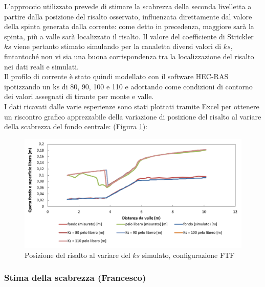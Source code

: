 \documentclass[12pt]{article} %
\begin{document}
\noindent L'approccio utilizzato prevede di stimare la scabrezza della seconda livelletta a partire dalla posizione del risalto osservato, influenzata direttamente dal valore della spinta generata dalla corrente: come detto in precedenza, maggiore sarà la spinta, più a valle sarà localizzato il risalto. Il valore del coefficiente di Strickler $ks$ viene pertanto stimato simulando per la canaletta diversi valori di $ks$, fintantoché non vi sia una buona corrispondenza tra la localizzazione del risalto nei dati reali e simulati.\\
Il profilo di corrente è stato quindi modellato con il software HEC-RAS ipotizzando un ks di 80, 90, 100 e 110 e adottando come condizioni di contorno dei valori assegnati di tirante per monte e valle.\\
I dati ricavati dalle varie esperienze sono stati plottati tramite Excel per ottenere un riscontro grafico apprezzabile della variazione di posizione del risalto al variare della scabrezza del fondo centrale: (Figura \ref{fig:risalto_FTF}):

\begin{figure}[H]
    \centering
    \includegraphics[width=\textwidth]{FTFrisalto5.5.png}
    \caption{Posizione del risalto al variare del $ks$ simulato, configurazione FTF}
    \label{fig:risalto_FTF}
\end{figure}

\subsubsection{Stima della scabrezza (Francesco)}
\end{document}
